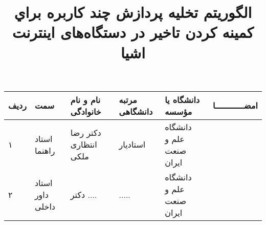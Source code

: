 \subject{مهندسی کامپیوتر}
\title{الگوريتم تخليه پردازش چند كاربره براي كمينه كردن تاخير در دستگاه‌های اينترنت اشيا}


\firstPage
\besmPage
\davaranPage

\begin{center}
\begin{tabular}{| p{8mm} | p{18mm} | p{} |p{14mm}|p{}|c|}
\hline
ردیف	& سمت & نام و نام خانوادگی & مرتبه \newline دانشگاهی &	دانشگاه یا مؤسسه & امضــــــــــــا\\
\hline
۱  & استاد راهنما & دکتر \newline رضا انتظاری ملکی 
& استادیار & دانشگاه \newline علم و صنعت ایران &  \\
\hline
۲ & استاد داور \newline داخلی	 & دکتر \newline ....  & ..... & 
دانشگاه  \newline علم ‌و صنعت ایران & \\
\hline

\end{tabular}
\end{center}

